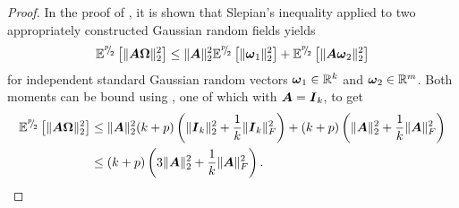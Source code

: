 \documentclass[12pt]{article}
\begin{document}
\begin{proof}
    In the proof of \cite[lemma B.1]{tropp-2023-randomized-algorithms}, it is shown that Slepian's inequality \cite[theorem 7.2.1]{vershynin-2018-random-processes} applied to two appropriately constructed Gaussian random fields yields
    \begin{equation}
        \mathbb{E}^{{}^{p}{\mskip -5mu/\mskip -3mu}_{2}}\left[ \lVert \boldsymbol{A} \boldsymbol{\Omega} \rVert _2^2 \right]
        \leq \lVert \boldsymbol{A} \rVert _2^2 \mathbb{E}^{{}^{p}{\mskip -5mu/\mskip -3mu}_{2}}\left[ \lVert \boldsymbol{\omega}_1 \rVert _2^2 \right] + \mathbb{E}^{{}^{p}{\mskip -5mu/\mskip -3mu}_{2}}\left[ \lVert \boldsymbol{A} \boldsymbol{\omega}_2 \rVert _2^2 \right]
    \end{equation}
    for independent standard Gaussian random vectors $\boldsymbol{\omega}_1 \in \mathbb{R}^{k}$ and $\boldsymbol{\omega}_2 \in \mathbb{R}^{m}$. Both moments can be bound using , one of which with $\boldsymbol{A} = \boldsymbol{I}_k$, to get
    \begin{align}
        \mathbb{E}^{{}^{p}{\mskip -5mu/\mskip -3mu}_{2}}\left[ \lVert \boldsymbol{A} \boldsymbol{\Omega} \rVert _2^2 \right]
        &\leq \lVert \boldsymbol{A} \rVert _2^2 (k + p) \left( \lVert \boldsymbol{I}_k \rVert _2^2 + \frac{1}{k} \lVert \boldsymbol{I}_k \rVert _F^2 \right) + (k + p) \left( \lVert \boldsymbol{A} \rVert _2^2 + \frac{1}{k} \lVert \boldsymbol{A} \rVert _F^2 \right) \notag \\
        &\leq (k + p) \left( 3 \lVert \boldsymbol{A} \rVert _2^2 + \frac{1}{k} \lVert \boldsymbol{A} \rVert _F^2 \right).
    \end{align}


\end{proof}
\end{document}
